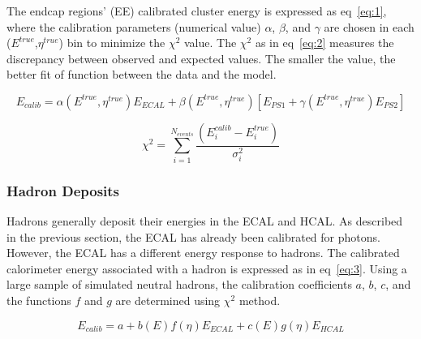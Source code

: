 The endcap regions' (EE) calibrated cluster energy is expressed as eq~\ref{eq:1},
where the calibration parameters (numerical value) $\alpha$, $\beta$, and $\gamma$ are chosen in each ($E^{true}$,$\eta^{true}$) bin to minimize the $\chi^{2}$ value.
The $\chi^{2}$ as in eq~\ref{eq:2} measures the discrepancy between observed and expected values. The smaller the value, the better fit of function between the data and the model.

\begin{equation}
E_{calib} = \alpha(E^{true},\eta^{true})E_{ECAL} + \beta(E^{true},\eta^{true})[E_{PS1}+\gamma(E^{true},\eta^{true})E_{PS2}]
\label{eq:1}
\end{equation}

\begin{equation}
\chi^{2} = \sum_{i=1}^{N_{events}}\frac{(E_{i}^{calib} - E_{i}^{true})}{\sigma_{i}^{2}}
\label{eq:2}
\end{equation}
\subsubsection{Hadron Deposits}

Hadrons generally deposit their energies in the ECAL and HCAL.
As described in the previous section, the ECAL has already been calibrated for photons.
However, the ECAL has a different energy response to hadrons.
The calibrated calorimeter energy associated with a hadron is expressed as in eq~\ref{eq:3}.
Using a large sample of simulated neutral hadrons, the calibration coefficients $a$, $b$, $c$, and the functions $f$ and $g$ are determined using $\chi^{2}$ method. 

\begin{equation}
E_{calib} = a + b(E)f(\eta)E_{ECAL} + c(E)g(\eta)E_{HCAL}
\label{eq:3}
\end{equation}
